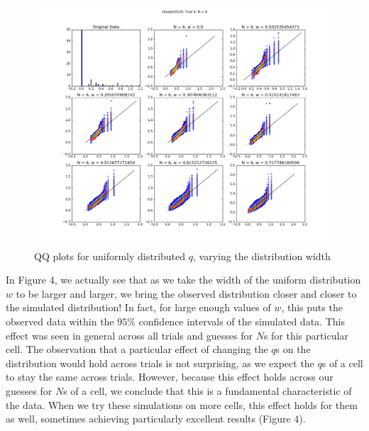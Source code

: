 \documentclass{article}
\begin{document}
\begin{figure}[h]
  \centering
  \caption{QQ plots for uniformly distributed $q$, varying the distribution width}
  \includegraphics[width=1.0\textwidth]{10sept2015f-4-6-qq}
\end{figure}

In Figure 4, we actually see that as we take the width of the uniform distribution $w$ to be larger and larger, we bring the observed distribution closer and closer to the simulated distribution! In fact, for large enough values of $w$, this puts the observed data within the $95\%$ confidence intervals of the simulated data. This effect was seen in general across all trials and guesses for $N$s for this particular cell. The observation that a particular effect of changing the $q$s on the distribution would hold across trials is not surprising, as we expect the $q$s of a cell to stay the same across trials. However, because this effect holds across our guesses for $N$s of a cell, we conclude that this is a fundamental characteristic of the data. When we try these simulations on more cells, this effect holds for them as well, sometimes achieving particularly excellent results (Figure 4).
\end{document}
